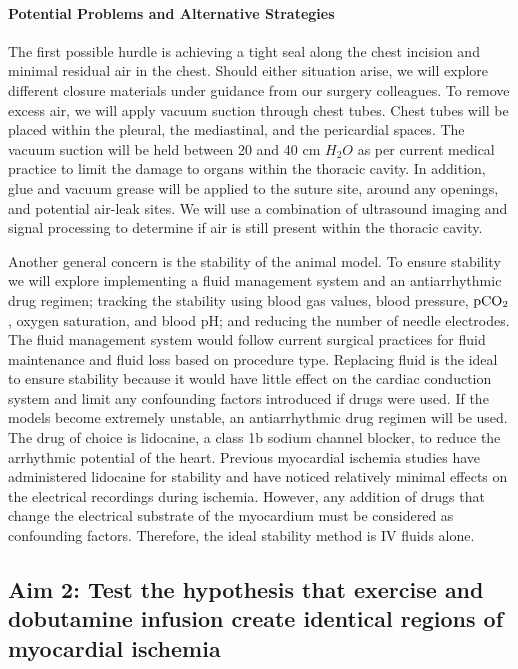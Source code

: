 \paragraph{Potential Problems and Alternative Strategies} The first possible hurdle is achieving a tight seal along the chest incision and minimal residual air in the chest.  Should either situation arise, we will explore different closure materials under guidance from our surgery colleagues. To remove excess air, we will apply vacuum suction through chest tubes. Chest tubes will be placed within the pleural, the mediastinal, and the pericardial spaces. The vacuum suction will be held between 20 and 40 cm $H_2O$ as per current medical practice to limit the damage to organs within the thoracic cavity. In addition, glue and vacuum grease will be applied to the suture site, around any openings, and potential air-leak sites. We will use a combination of ultrasound imaging and signal processing to determine if air is still present within the thoracic cavity. 

Another general concern is the stability of the animal model. To ensure stability we will explore implementing a fluid management system and an antiarrhythmic drug regimen; tracking the stability using blood gas values, blood pressure, ${\rm pCO_2}$, oxygen saturation, and blood pH; and reducing the number of needle electrodes. The fluid management system would follow current surgical practices for fluid maintenance and fluid loss based on procedure type. Replacing fluid is the ideal to ensure stability because it would have little effect on the cardiac conduction system and limit any confounding factors introduced if drugs were used. If the models become extremely unstable, an antiarrhythmic drug regimen will be used. The drug of choice is lidocaine, a class 1b sodium channel blocker, to reduce the arrhythmic potential of the heart. Previous myocardial ischemia studies have administered lidocaine for stability and have noticed relatively minimal effects on the electrical recordings during ischemia. However, any addition of drugs that change the electrical substrate of the myocardium must be considered as confounding factors. Therefore, the ideal stability method is IV fluids alone. 


\subsection{Aim 2: Test the hypothesis that exercise and dobutamine infusion create identical regions of myocardial ischemia}

